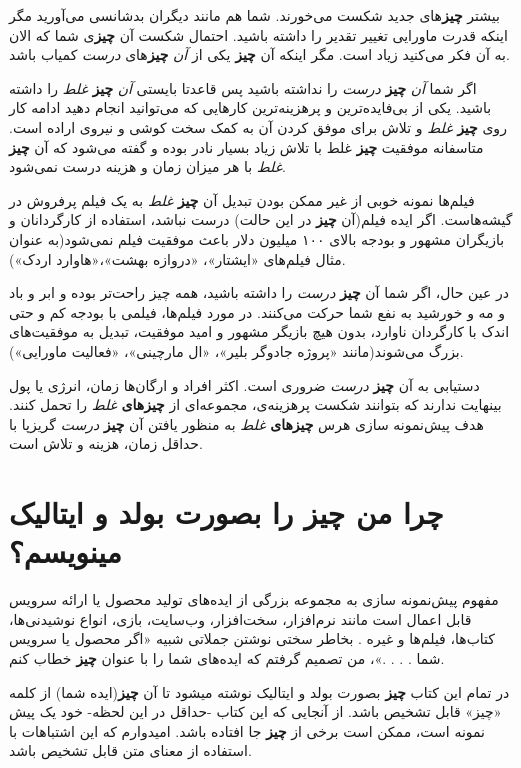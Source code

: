 بیشتر \textbf{چیز}های جدید شکست می‌خورند. شما هم مانند دیگران بدشانسی
می‌آورید مگر اینکه قدرت ماورایی تغییر تقدیر را داشته باشید. احتمال شکست
آن \textbf{چیز}ی شما که الان به آن فکر می‌کنید زیاد است. مگر اینکه آن
\textbf{چیز} یکی از \emph{آن} \textbf{چیز}های \emph{درست} کمیاب باشد.

اگر شما \emph{آن} \textbf{چیز} \emph{درست} را نداشته باشید پس قاعدتا
بایستی \emph{آن} \textbf{چیز} \emph{غلط} را داشته باشید. یکی از
بی‌فایده‌ترین و پرهزینه‌ترین کارهایی که می‌توانید انجام دهید ادامه کار
روی \textbf{چیز} \emph{غلط} و تلاش برای موفق کردن آن به کمک سخت کوشی و
نیروی اراده است. متاسفانه موفقیت \textbf{چیز} غلط با تلاش زیاد بسیار
نادر بوده و گفته می‌شود که آن \textbf{چیز} \emph{غلط} با هر میزان زمان و
هزینه درست نمی‌شود.

فیلم‌ها نمونه خوبی از غیر ممکن بودن تبدیل آن \textbf{چیز} \emph{غلط} به
یک فیلم پرفروش در گیشه‌هاست. اگر ایده فیلم(آن \textbf{چیز} در این حالت)
درست نباشد، استفاده از کارگردانان و بازیگران مشهور و بودجه بالای ۱۰۰
میلیون دلار باعث موفقیت فیلم نمی‌شود(به عنوان مثال فیلم‌های «ایشتار»،
«دروازه بهشت»،«هاوارد اردک»).

در عین حال، اگر شما آن \textbf{چیز} \emph{درست} را داشته باشید، همه چیز
راحت‌تر بوده و ابر و باد و مه و خورشید به نفع شما حرکت می‌کنند. در مورد
فیلم‌ها، فیلمی با بودجه کم و حتی اندک با کارگردان ناوارد، بدون هیچ
بازیگر مشهور و امید موفقیت، تبدیل به موفقیت‌های بزرگ می‌شوند(مانند
«پروژه جادوگر بلیر»، «ال مارچینی»، «فعالیت ماورایی»).

دستیابی به آن \textbf{چیز} \emph{درست} ضروری است. اکثر افراد و ارگان‌ها
زمان، انرژی یا پول بینهایت ندارند که بتوانند شکست پرهزینه‌ی، مجموعه‌ای
از \textbf{چیزهای} \emph{غلط} را تحمل کنند. هدف پیش‌نمونه سازی هرس
\textbf{چیزهای} \emph{غلط} به منظور یافتن آن \textbf{چیز} \emph{درست}
گریزپا با حداقل زمان، هزینه و تلاش است.

\section{چرا من \textbf{چیز} را بصورت بولد و ایتالیک
مینویسم؟}\label{ux686ux631ux627-ux645ux646-ux686ux6ccux632-ux631ux627-ux628ux635ux648ux631ux62a-ux628ux648ux644ux62f-ux648-ux627ux6ccux62aux627ux644ux6ccux6a9-ux645ux6ccux646ux648ux6ccux633ux645}

مفهوم پیش‌نمونه سازی به مجموعه بزرگی از ایده‌های تولید محصول یا ارائه
سرویس قابل اعمال است مانند نرم‌افزار، سخت‌افزار، وب‌سایت، بازی، انواع
نوشیدنی‌ها، کتاب‌ها، فیلم‌ها و غیره . بخاطر سختی نوشتن جملاتی شبیه «اگر
محصول یا سرویس شما . . . .»، من تصمیم گرفتم که ایده‌های شما را با عنوان
\textbf{چیز} خطاب کنم.

در تمام این کتاب \textbf{چیز} بصورت بولد و ایتالیک نوشته میشود تا آن
\textbf{چیز}(ایده شما) از کلمه «چیز» قابل تشخیص باشد. از آنجایی که این
کتاب -حداقل در این لحظه- خود یک پیش نمونه است، ممکن است برخی از
\textbf{چیز} جا افتاده باشد. امیدوارم که این اشتباهات با استفاده از
معنای متن قابل تشخیص باشد.
